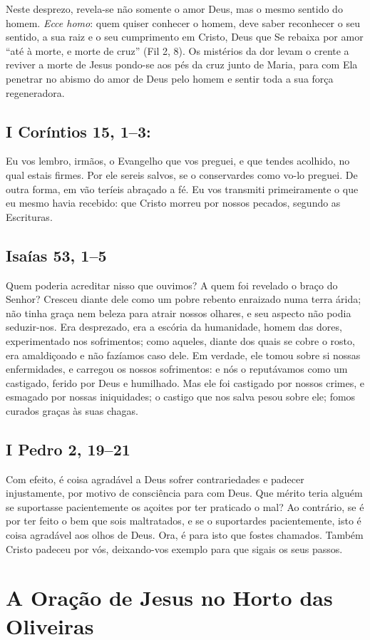 \documentclass[10pt,a5paper]{book}
\newcommand{\from}[1]{\subsection*{#1}}
\begin{document}
Neste desprezo, revela-se não somente o amor Deus, mas o mesmo sentido do homem.
\emph{Ecce homo}:
quem quiser conhecer o homem, deve saber reconhecer o seu sentido, a sua raiz e o seu cumprimento em Cristo, Deus que Se rebaixa por amor ``até à morte, e morte de cruz'' (Fil 2, 8).
Os mistérios da dor levam o crente a reviver a morte de Jesus pondo-se aos pés da cruz junto de Maria, para com Ela penetrar no abismo do amor de Deus pelo homem e sentir toda a sua força regeneradora.

\from{I Coríntios 15, 1--3:}

Eu vos lembro, irmãos, o Evangelho que vos preguei, e que tendes acolhido, no qual estais firmes.
Por ele sereis salvos, se o conservardes como vo-lo preguei.
De outra forma, em vão teríeis abraçado a fé.
Eu vos transmiti primeiramente o que eu mesmo havia recebido:
que Cristo morreu por nossos pecados, segundo as Escrituras.

\from{Isaías 53, 1--5}

Quem poderia acreditar nisso que ouvimos?
A quem foi revelado o braço do Senhor?
Cresceu diante dele como um pobre rebento enraizado numa terra árida;
não tinha graça nem beleza para atrair nossos olhares, e seu aspecto não podia seduzir-nos.
Era desprezado, era a escória da humanidade, homem das dores, experimentado nos sofrimentos;
como aqueles, diante dos quais se cobre o rosto, era amaldiçoado e não fazíamos caso dele.
Em verdade, ele tomou sobre si nossas enfermidades, e carregou os nossos sofrimentos: e nós o reputávamos como um castigado, ferido por Deus e humilhado.
Mas ele foi castigado por nossos crimes, e esmagado por nossas iniquidades;
o castigo que nos salva pesou sobre ele;
fomos curados graças às suas chagas.

\from{I Pedro 2, 19--21}

Com efeito, é coisa agradável a Deus sofrer contrariedades e padecer injustamente, por motivo de consciência para com Deus.
Que mérito teria alguém se suportasse pacientemente os açoites por ter praticado o mal?
Ao contrário, se é por ter feito o bem que sois maltratados, e se o suportardes pacientemente, isto é coisa agradável aos olhos de Deus.
Ora, é para isto que fostes chamados.
Também Cristo padeceu por vós, deixando-vos exemplo para que sigais os seus passos.


\section{A Oração de Jesus no Horto das Oliveiras}
\end{document}
